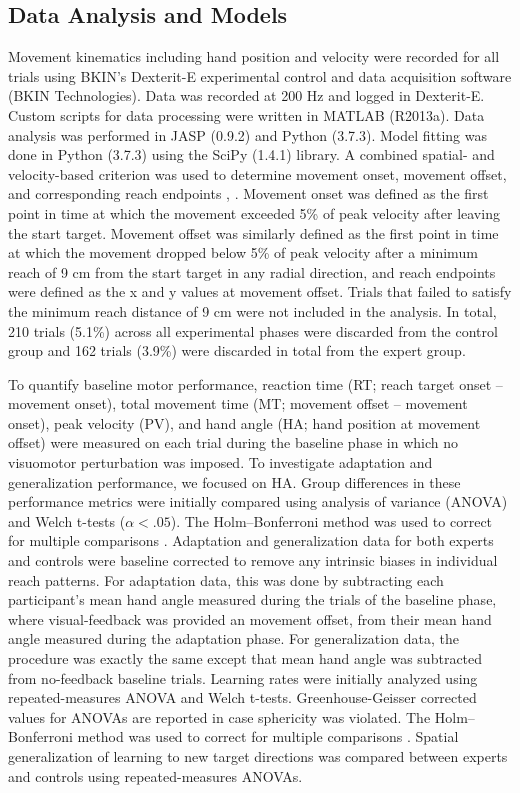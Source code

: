 \documentclass[jou, 11pt, longtable, floatsintext, notab]{apa6}
\begin{document}
\subsection{Data Analysis and Models}
Movement kinematics including hand position and velocity
were recorded for all trials using BKIN’s Dexterit-E
experimental control and data acquisition software (BKIN
Technologies). Data was recorded at 200 Hz and logged in
Dexterit-E. Custom scripts for data processing were written
in MATLAB (R2013a). Data analysis was performed in JASP
(0.9.2) and Python (3.7.3). Model fitting was done in Python
(3.7.3) using the SciPy (1.4.1) library. A combined spatial-
and velocity-based criterion was used to determine movement
onset, movement offset, and corresponding reach endpoints
\cite{georgopoulos_relations_1982},
\cite{scott_dissociation_2001}. Movement onset was defined
as the first point in time at which the movement exceeded
5\% of peak velocity after leaving the start target.
Movement offset was similarly defined as the first point in
time at which the movement dropped below 5\% of peak
velocity after a minimum reach of 9 cm from the start target
in any radial direction, and reach endpoints were defined as
the x and y values at movement offset. Trials that failed to
satisfy the minimum reach distance of 9 cm were not included
in the analysis. In total, 210 trials (5.1\%) across all
experimental phases were discarded from the control group
and 162 trials (3.9\%) were discarded in total from the
expert group.

To quantify baseline motor performance, reaction time (RT;
reach target onset – movement onset), total movement time
(MT; movement offset – movement onset), peak velocity (PV),
and hand angle (HA; hand position at movement offset) were
measured on each trial during the baseline phase in which no
visuomotor perturbation was imposed. To investigate
adaptation and generalization performance, we focused on HA.
Group differences in these performance metrics were
initially compared using analysis of variance (ANOVA) and
Welch t-tests ($\alpha < .05$). The Holm–Bonferroni method
was used to correct for multiple comparisons
\cite{holm_simple_1979}. Adaptation and generalization data
for both experts and controls were baseline corrected to
remove any intrinsic biases in individual reach patterns.
For adaptation data, this was done by subtracting each
participant’s mean hand angle measured during the trials of
the baseline phase, where visual-feedback was provided an
movement offset, from their mean hand angle measured during
the adaptation phase. For generalization data, the procedure
was exactly the same except that mean hand angle was
subtracted from no-feedback baseline trials. Learning rates
were initially analyzed using repeated-measures ANOVA and
Welch t-tests. Greenhouse-Geisser corrected values for
ANOVAs are reported in case sphericity was violated. The
Holm–Bonferroni method was used to correct for multiple
comparisons \cite{holm_simple_1979}. Spatial generalization
of learning to new target directions was compared between
experts and controls using repeated-measures ANOVAs.
\end{document}
